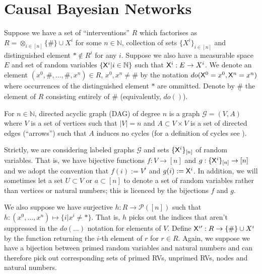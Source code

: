 
\section{Causal Bayesian Networks}

Suppose we have a set of ``interventions'' $R$ which factorises as $R=\otimes_{i\in [n]} \{\#\}\cup X^i$ for some $n\in \mathbb{N}$, collection of sets $\{X^i\}_{i\in [n]}$ and distinguished element $*\not\in R^i$ for any $i$. Suppose we also have a measurable space $E$ and set of random variables $\{\mathsf{X}^i|i\in \mathbb{N}\}$ such that $\mathsf{X}^i:E\to X^i$. We denote an element $(x^0,\#,...,\#,x^n)\in R$, $x^0,x^n\neq \#$ by the notation $do(\mathsf{X}^0=x^0,\mathsf{X}^n=x^n)$ where occurrences of the distinguished element $*$ are ommitted. Denote by $\underline{\#}$ the element of $R$ consisting entirely of $\#$ (equivalently, $do()$).

For $n\in \mathbb{N}$, directed acyclic graph (DAG) of degree $n$ is a graph $\mathcal{G}=(V,A)$ where $V$ is a set of vertices such that $|V|=n$ and $A\subset V\times V$ is a set of directed edges (``arrows'') such that $A$ induces no cycles (for a definition of cycles see \citet{pearl_causality:_2009}). 

Strictly, we are considering labeled graphs $\mathcal{G}$ and sets $\{\mathsf{X}^i\}_{[n]}$ of random variables. That is, we have bijective functions $f:V\to [n]$ and $g:\{\mathsf{X}^i\}_{[n]}\to [n]$ and we adopt the convention that $f(i):=V^i$ and $g(i):=\mathsf{X}^i$. In addition, we will sometimes let a set $U\subset V$ or $a\subset[n]$ to denote a set of random variables rather than vertices or natural numbers; this is licenced by the bijections $f$ and $g$. 

We also suppose we have surjective $h:R\to \mathscr{P}([n])$ such that $h:(x^0,...,x^n)\mapsto \{i|x^i\neq *\}$. That is, $h$ picks out the indices that aren't suppressed in the $do(...)$ notation for elements of $V$. Define $\mathsf{X}^{i\prime}:R\to \{\#\}\cup X^i$ by the function returning the $i$-th element of $r$ for $r\in R$. Again, we suppose we have a bijection between primed random variables and natural numbers and can therefore pick out corresponding sets of primed RVs, unprimed RVs, nodes and natural numbers.

